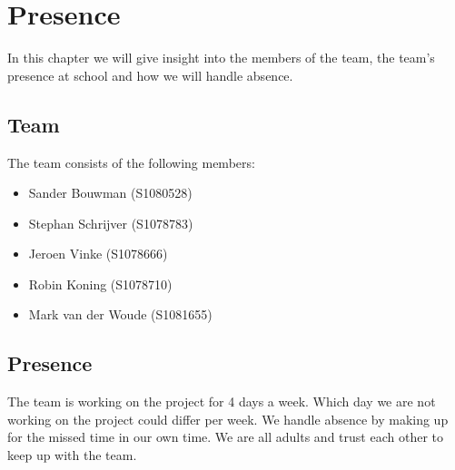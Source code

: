 \section{Presence}
In this chapter we will give insight into the members of the team, the team's presence at school and how we will handle absence.

\subsection{Team}
The team consists of the following members:
\begin{itemize}
  \item Sander Bouwman (S1080528)
  \item Stephan Schrijver (S1078783)
  \item Jeroen Vinke (S1078666)
  \item Robin Koning (S1078710)
  \item Mark van der Woude (S1081655)
\end{itemize}
\subsection{Presence}
The team is working on the project for 4 days a week. Which day we are not working on the project could differ per week. We handle absence by making up for the missed time in our own time. We are all adults and trust each other to keep up with the team.



